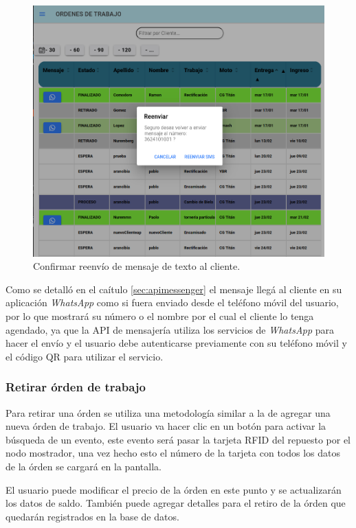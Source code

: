\begin{figure}[H]
	\centering
	\includegraphics[scale=.30]{./Figures/listado-3.png}
	\caption{Confirmar reenvío de mensaje de texto al cliente.}
	\label{fig:listado3}
\end{figure}

Como se detalló en el caítulo \ref{sec:apimessenger} el mensaje llegá al cliente en su aplicación \textit{WhatsApp} como si fuera enviado desde el teléfono móvil del usuario, por lo que mostrará su número o el nombre por el cual el cliente lo tenga agendado, ya que la API de mensajería utiliza los servicios de \textit{WhatsApp} para hacer el envío y el usuario debe autenticarse previamente con su teléfono móvil y el código QR para utilizar el servicio.

\subsubsection{Retirar órden de trabajo}
\label{subsubsec:frontretirar}

Para retirar una órden se utiliza una metodología similar a la de agregar una nueva órden de trabajo. El usuario va hacer clic en un botón para activar la búsqueda de un evento, este evento será pasar la tarjeta RFID del repuesto por el nodo mostrador, una vez hecho esto el número de la tarjeta con todos los datos de la órden se cargará en la pantalla. 

El usuario puede modificar el precio de la órden en este punto y se actualizarán los datos de saldo. También puede agregar detalles para el retiro de la órden que quedarán registrados en la base de datos.

